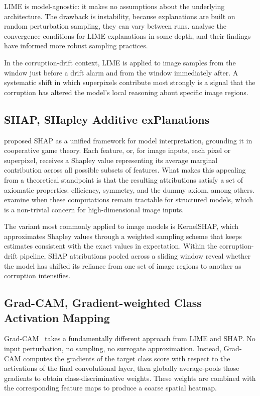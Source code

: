 LIME is model-agnostic: it makes no assumptions about the underlying architecture. The drawback is instability, because explanations are built on random perturbation sampling, they can vary between runs. \textcite{garreau2020explaining} analyse the convergence conditions for LIME explanations in some depth, and their findings have informed more robust sampling practices.

In the corruption-drift context, LIME is applied to image samples from the window just before a drift alarm and from the window immediately after. A systematic shift in which superpixels contribute most strongly is a signal that the corruption has altered the model's local reasoning about specific image regions.

\subsection{SHAP, SHapley Additive exPlanations}

\textcite{Lundberg2017} proposed SHAP as a unified framework for model interpretation, grounding it in cooperative game theory. Each feature, or, for image inputs, each pixel or superpixel, receives a Shapley value representing its average marginal contribution across all possible subsets of features. What makes this appealing from a theoretical standpoint is that the resulting attributions satisfy a set of axiomatic properties: efficiency, symmetry, and the dummy axiom, among others. \textcite{VandenBroeck2022} examine when these computations remain tractable for structured models, which is a non-trivial concern for high-dimensional image inputs.

The variant most commonly applied to image models is KernelSHAP, which approximates Shapley values through a weighted sampling scheme that keeps estimates consistent with the exact values in expectation. Within the corruption-drift pipeline, SHAP attributions pooled across a sliding window reveal whether the model has shifted its reliance from one set of image regions to another as corruption intensifies.

\subsection{Grad-CAM, Gradient-weighted Class Activation Mapping}

Grad-CAM~\autocite{Selvaraju2019} takes a fundamentally different approach from LIME and SHAP. No input perturbation, no sampling, no surrogate approximation. Instead, Grad-CAM computes the gradients of the target class score with respect to the activations of the final convolutional layer, then globally average-pools those gradients to obtain class-discriminative weights. These weights are combined with the corresponding feature maps to produce a coarse spatial heatmap.

